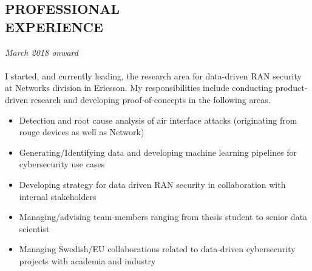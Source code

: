 \documentclass[margin, 10pt]{res} %
\begin{document}
\begin{resume}
\section{PROFESSIONAL \\ EXPERIENCE}

{\sl \textbf{}} \hfill \textit{March 2018 onward} \\
{\color{RubineRed}{Ericsson AB, Sweden}} \\
I started, and currently leading, the research area for data-driven RAN security at Networks division in Ericsson. My responsibilities include conducting product-driven research and developing proof-of-concepts in the following areas.

\begin{itemize}
    \item Detection and root cause analysis of air interface attacks (originating from rouge devices as well as Network)
    \item Generating/Identifying data and developing machine learning pipelines for cybersecurity use cases
    \item Developing strategy for data driven RAN security in collaboration with internal stakeholders
    \item Managing/advising team-members ranging from thesis student to senior data scientist
    \item Managing Swedish/EU collaborations related to data-driven cybersecurity projects with academia and industry
\end{itemize}


\end{resume}
\end{document}
